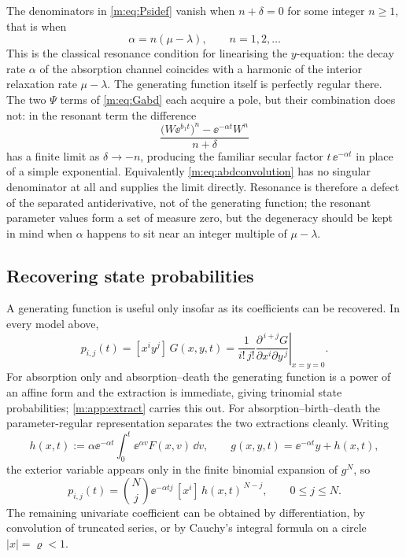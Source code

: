\begin{remark}[Resonance]
\label{m:rem:resonance}
The denominators in \cref{m:eq:Psidef} vanish when $n+\delta=0$ for some integer
$n\ge1$, that is when
\begin{equation}
\label{m:eq:resonance}
\alpha = n(\mu-\lambda),\qquad n=1,2,\dots
\end{equation}
This is the classical resonance condition for linearising the $y$-equation: the
decay rate $\alpha$ of the absorption channel coincides with a harmonic of the
interior relaxation rate $\mu-\lambda$. The generating function itself is perfectly
regular there. The two $\Psi$ terms of \cref{m:eq:Gabd} each acquire a pole, but
their combination does not: in the resonant term the difference
\begin{equation*}
\frac{\bigl(W\ee^{b_1t}\bigr)^{n} - \ee^{-\alpha t}W^{n}}{n+\delta}
\end{equation*}
has a finite limit as $\delta\to-n$, producing the familiar secular factor
$t\,\ee^{-\alpha t}$ in place of a simple exponential. Equivalently
\cref{m:eq:abdconvolution} has no singular denominator at all and supplies the
limit directly. Resonance is therefore a defect of the separated antiderivative,
not of the generating function; the resonant parameter values form a set of measure
zero, but the degeneracy should be kept in mind when $\alpha$ happens to sit near an
integer multiple of $\mu-\lambda$.
\end{remark}

\subsection{Recovering state probabilities}
\label{m:app:coefrecovery}

A generating function is useful only insofar as its coefficients can be recovered.
In every model above,
\begin{equation}
\label{m:eq:bivariatecoef}
p_{i,j}(t) = [x^iy^j]\,G(x,y,t)
= \frac{1}{i!\,j!}\left.\frac{\partial^{\,i+j}G}{\partial x^i\partial y^{\,j}}
\right|_{x=y=0} .
\end{equation}
For absorption only and absorption--death the generating function is a power of an
affine form and the extraction is immediate, giving trinomial state probabilities;
\cref{m:app:extract} carries this out. For absorption--birth--death the
parameter-regular representation separates the two extractions cleanly. Writing
\begin{equation}
\label{m:eq:hdef}
h(x,t) := \alpha\ee^{-\alpha t}\int_0^t\ee^{\alpha v}F(x,v)\,\dd v,
\qquad
g(x,y,t) = \ee^{-\alpha t}y + h(x,t),
\end{equation}
the exterior variable appears only in the finite binomial expansion of $g^N$, so
\begin{equation}
\label{m:eq:abdcoef}
p_{i,j}(t) = \binom{N}{j}\ee^{-\alpha tj}\,[x^i]\,h(x,t)^{\,N-j},
\qquad 0\le j\le N .
\end{equation}
The remaining univariate coefficient can be obtained by differentiation, by
convolution of truncated series, or by Cauchy's integral formula on a circle
$|x|=\varrho<1$.

\FloatBarrier
